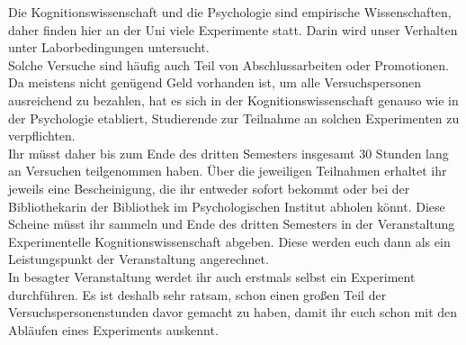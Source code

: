Die Kognitionswissenschaft und die Psychologie sind empirische Wissenschaften, daher finden hier an der Uni viele Experimente statt. Darin wird unser Verhalten unter Laborbedingungen untersucht.\\
Solche Versuche sind häufig auch Teil von Abschlussarbeiten oder Promotionen. Da meistens nicht genügend Geld vorhanden ist, um alle Versuchspersonen ausreichend zu bezahlen, hat es sich in der Kognitionswissenschaft genauso wie in der Psychologie etabliert, Studierende zur Teilnahme an solchen Experimenten zu verpflichten.\\
Ihr müsst daher bis zum Ende des dritten Semesters insgesamt 30 Stunden lang an Versuchen teilgenommen haben. Über die jeweiligen Teilnahmen erhaltet ihr jeweils eine Bescheinigung, die ihr entweder sofort bekommt oder bei der Bibliothekarin der Bibliothek im Psychologischen Institut abholen könnt. Diese Scheine müsst ihr sammeln und Ende des dritten Semesters in der Veranstaltung Experimentelle Kognitionswissenschaft abgeben. Diese werden euch dann als ein Leistungspunkt der Veranstaltung angerechnet.\\
In besagter Veranstaltung werdet ihr auch erstmals selbst ein Experiment durchführen. Es ist deshalb sehr ratsam, schon einen großen Teil der Versuchspersonenstunden davor gemacht zu haben, damit ihr euch schon mit den Abläufen eines Experiments auskennt.
